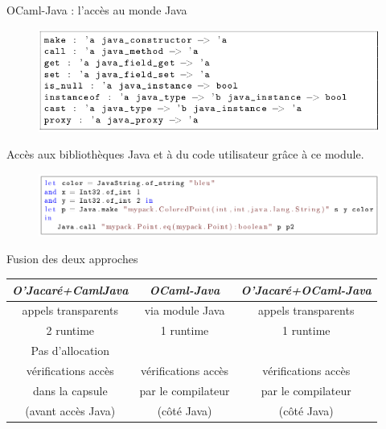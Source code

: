 \documentclass{beamer}
\begin{document}
\begin{frame}{OCaml-Java : l'accès au monde Java}
\begin{figure}[h]
  \centering
  \includegraphics[scale=0.33]{methModuleJava.png}
\end{figure}

Accès aux bibliothèques Java et à du code utilisateur grâce à ce module.
\begin{figure}[h]
  \centering
  \includegraphics[scale=0.30]{exempleOCaml-Java.png}
\end{figure}

\end{frame}


\begin{frame}{Fusion des deux approches}

\begin{tabular}{|c|c|c|}
  \hline
   \emph{O'Jacaré+CamlJava} & \emph{OCaml-Java} & \emph{O'Jacaré+OCaml-Java}\\
  \hline
  appels transparents & via module Java & appels transparents\\\hline
  2 runtime & 1 runtime & 1 runtime \\\hline
  Pas d'allocation & & \\\hline
  vérifications accès & vérifications accès & vérifications accès \\
  dans la capsule & par le compilateur & par le compilateur\\
  (avant accès Java) & (côté Java) & (côté Java) \\ \hline
\end{tabular}

\end{frame}
\end{document}
